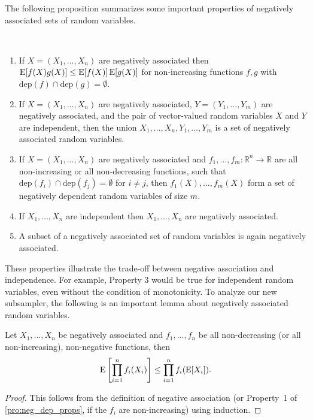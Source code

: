 The following proposition summarizes some important properties of negatively associated sets of random variables.
\begin{proposition}\label{pro:neg_dep_props}~
\begin{enumerate}
\item \label{it:neg_dep_props:mult_mono} If $X=(X_1,\ldots,X_n)$ are negatively associated then $\operatorname{\mathrm{E}} [f(X) g(X)] \leq \operatorname{\mathrm{E}} [f(X)] \operatorname{\mathrm{E}} [g(X)]$ for non-increasing functions $f,g$ with $\mathrm{dep}(f) \cap \mathrm{dep}(g) = \emptyset$.
\item If $X=(X_1,\ldots,X_n)$ are negatively associated, $Y=(Y_1,\ldots,Y_m)$ are negatively associated, and the pair of vector-valued random variables $X$ and $Y$ are independent, then the union $X_1,\dots,X_n,Y_1,\dots,Y_m$ is a set of negatively associated random variables.
\item If $X=(X_1,\ldots,X_n)$ are negatively associated and $f_1, \dots ,f_m : \mathbb R^n \rightarrow \mathbb R$ are all non-increasing or all non-decreasing functions, such that $\mathrm{dep}(f_i) \cap \mathrm{dep}(f_j) = \emptyset$ for $i \neq j$, then $f_1(X),\ldots,f_m(X)$ form a set of negatively dependent random variables of size $m$.
\item If $X_1,\dots,X_n$ are independent then $X_1,\dots,X_n$ are negatively associated.
\item A subset of a negatively associated set of random variables is again negatively associated.
\end{enumerate}
\end{proposition}

These properties illustrate the trade-off between negative association and independence.
For example, Property 3 would be true for independent random variables, even without the condition of monotonicity.
To analyze our new subsampler, the following is an important lemma about negatively associated random variables.

\begin{lemma}\label{le:neg_assoc_prod}
Let $X_1,\dots,X_n$ be negatively associated and $f_1,\dots,f_n$ be all non-decreasing (or all non-increasing), non-negative functions, then
\[
  \operatorname{\mathrm{E}} \left[\prod_{i=1}^{n} f_i(X_i)\right] \leq \prod_{i=1}^{n} f_i(\operatorname{\mathrm{E}} [X_i]) \textrm{.}
\]
\end{lemma}
\begin{proof}
This follows from the definition of negative association (or Property~1 of \cref{pro:neg_dep_props}, if the $f_i$ are non-increasing) using induction.
\end{proof}

